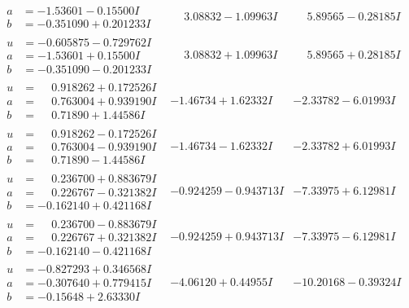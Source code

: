 \documentclass[1p]{elsarticle_modified}
\theoremstyle{definition}
\begin{document}
$$\begin{array}{c|c|c}
\begin{aligned}
a &= -1.53601 - 0.15500 I \\
b &= -0.351090 + 0.201233 I\end{aligned}
 & \phantom{-}3.08832 - 1.09963 I & \phantom{-}5.89565 - 0.28185 I \\ \hline\begin{aligned}
u &= -0.605875 - 0.729762 I \\
a &= -1.53601 + 0.15500 I \\
b &= -0.351090 - 0.201233 I\end{aligned}
 & \phantom{-}3.08832 + 1.09963 I & \phantom{-}5.89565 + 0.28185 I \\ \hline\begin{aligned}
u &= \phantom{-}0.918262 + 0.172526 I \\
a &= \phantom{-}0.763004 + 0.939190 I \\
b &= \phantom{-}0.71890 + 1.44586 I\end{aligned}
 & -1.46734 + 1.62332 I & -2.33782 - 6.01993 I \\ \hline\begin{aligned}
u &= \phantom{-}0.918262 - 0.172526 I \\
a &= \phantom{-}0.763004 - 0.939190 I \\
b &= \phantom{-}0.71890 - 1.44586 I\end{aligned}
 & -1.46734 - 1.62332 I & -2.33782 + 6.01993 I \\ \hline\begin{aligned}
u &= \phantom{-}0.236700 + 0.883679 I \\
a &= \phantom{-}0.226767 - 0.321382 I \\
b &= -0.162140 + 0.421168 I\end{aligned}
 & -0.924259 - 0.943713 I & -7.33975 + 6.12981 I \\ \hline\begin{aligned}
u &= \phantom{-}0.236700 - 0.883679 I \\
a &= \phantom{-}0.226767 + 0.321382 I \\
b &= -0.162140 - 0.421168 I\end{aligned}
 & -0.924259 + 0.943713 I & -7.33975 - 6.12981 I \\ \hline\begin{aligned}
u &= -0.827293 + 0.346568 I \\
a &= -0.307640 + 0.779415 I \\
b &= -0.15648 + 2.63330 I\end{aligned}
 & -4.06120 + 0.44955 I & -10.20168 - 0.39324 I \\ \hline\begin{aligned}

\end{aligned}
\end{array}$$
\end{document}
